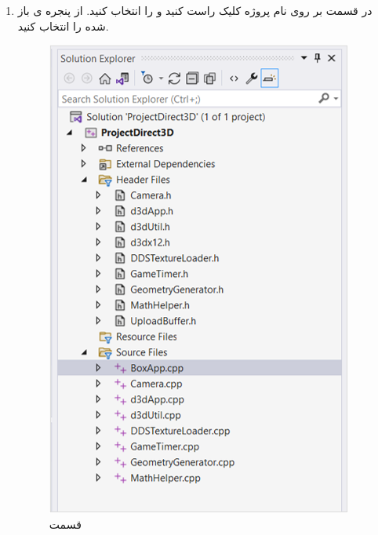 {\begin{spacing}{1.5}
        \begin{enumerate}
            \item {در قسمت  بر روی نام پروژه کلیک راست کنید و  را انتخاب کنید.
            از پنجره ی باز شده  را انتخاب کنید.
                \begin{figure}[H]
                    \centering
                    \setlength{\belowcaptionskip}{-10pt}
                    \includegraphics[scale=0.9]{Images/3/3.Intro.5.9.1}
                    \caption{قسمت }
                    \label{fig:3.Intro.5.9.1}
                \end{figure}
            }


\end{enumerate}
\end{spacing}}

